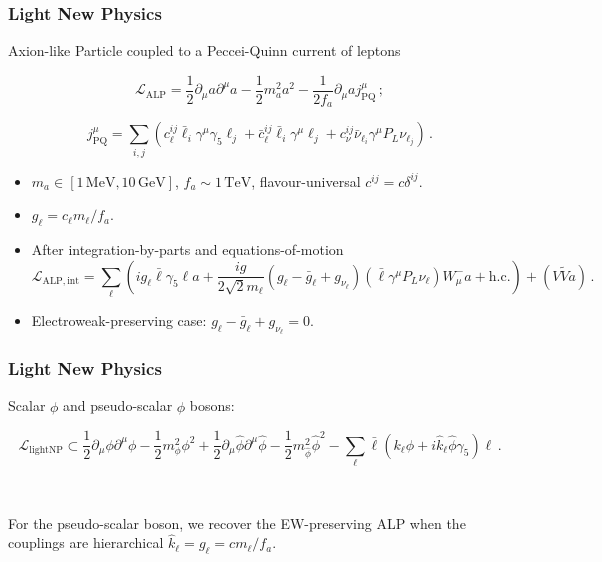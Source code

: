 \documentclass[mathserif, 10pt, aspectratio=169]{beamer}
\begin{document}
\begin{frame}\frametitle{Light New Physics}
    Axion-like Particle coupled to a Peccei-Quinn current of leptons

    $$\mathcal{L}_\mathrm{ALP} = \frac{1}{2}\partial_\mu a \partial^\mu a - \frac{1}{2} m_a^2 a^2 - \frac{1}{2 f_a}\partial_\mu a j^\mu_\mathrm{PQ}\,;$$

    $$j^\mu_\mathrm{PQ} = \sum_{i,j} \left( c_\ell^{ij} \bar{\ell}_i\gamma^\mu \gamma_5 \ell_j + \bar{c}_\ell^{ij} \bar{\ell}_i\gamma^\mu  \ell_j  + c_\nu^{ij} \bar{\nu}_{\ell_i} \gamma^\mu P_L \nu_{\ell_j} \right)\,. $$

    \begin{itemize}
        \item $m_a \in [1\,\mathrm{MeV}, 10\,\mathrm{GeV}]$, $f_a \sim 1\,\mathrm{TeV}$, flavour-universal $c^{ij} = c \delta^{ij}$.
        
        \item $g_\ell = c_\ell m_\ell/f_a$.
        
        \item After integration-by-parts and equations-of-motion
        $$\mathcal{L}_\mathrm{ALP, int} = \sum_\ell \left(i g_\ell \bar{\ell}\gamma_5\ell a + \frac{ig}{2 \sqrt{2} m_\ell} (g_\ell - \bar{g}_\ell + g_{\nu_\ell}) (\bar{\ell}\gamma^\mu P_L \nu_\ell) W^-_\mu a + \mathrm{h.c.} \right) + (V\tilde{V}a)\,.$$

        \item Electroweak-preserving case: $g_\ell - \bar{g}_\ell + g_{\nu_\ell}=0$.
    \end{itemize}
\end{frame}

\begin{frame}\frametitle{Light New Physics}

    Scalar $\phi$ and pseudo-scalar $\hat{\phi}$ bosons:

    $$\mathcal{L}_\mathrm{light NP} \subset \frac{1}{2}\partial_\mu \phi \partial^\mu \phi - \frac{1}{2} m_\phi^2 \phi^2 + \frac{1}{2}\partial_\mu \hat{\phi} \partial^\mu \hat{\phi} - \frac{1}{2} m_{\hat{\phi}}^2 \hat{\phi}^2 - \sum_\ell \bar{\ell}(k_\ell \phi + i \hat{k}_\ell \hat{\phi}\gamma_5) \ell\,.$$

    ~
    
    For the pseudo-scalar boson, we recover the EW-preserving ALP when the couplings are hierarchical $\hat{k}_\ell = g_\ell = c m_\ell/f_a$.
\end{frame}
\end{document}
